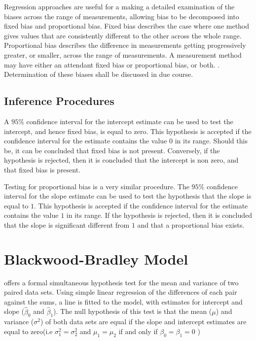\documentclass[12pt, a4paper]{report}
\theoremstyle{plain}
\theoremstyle{definition}
\theoremstyle{remark}
\begin{document}
	Regression approaches are useful for a making a detailed examination of the biases across the range of measurements, allowing bias to be decomposed into fixed bias and proportional bias.
	Fixed bias describes the case where one method gives values that are consistently different
	to the other across the whole range. Proportional
	bias describes the difference in measurements getting progressively greater, or smaller, across the range of measurements. A measurement method may have either an attendant fixed bias or proportional bias, or both. \citep{ludbrook}. Determination of these biases shall be discussed in due course.
	
	
	



\subsection{Inference Procedures}
A $95\%$ confidence interval for the intercept estimate can be used to test the intercept, and hence fixed bias, is equal to
zero. This hypothesis is accepted if the confidence interval for the estimate contains the value $0$ in its range. Should this be,
it can be concluded that fixed bias is not present. Conversely, if the hypothesis is rejected, then it is concluded that the
intercept is non zero, and that fixed bias is present.

Testing for proportional bias is a very similar procedure. The $95\%$ confidence interval for the slope estimate can be used to
test the hypothesis that the slope is equal to $1$. This hypothesis is accepted if the confidence interval for the estimate
contains the value $1$ in its range. If the hypothesis is rejected, then it is concluded that the slope is significant
different from $1$ and that a proportional bias exists.



	\section{Blackwood-Bradley Model} 
\citet{BB89} offers a formal simultaneous hypothesis test for the
mean and variance of two paired data sets. Using simple linear
regression of the differences of each pair against the sums, a
line is fitted to the model, with estimates for intercept and
slope ($\hat{\beta}_{0}$ and $\hat{\beta}_{1}$). The null
hypothesis of this test is that the mean ($\mu$) and variance
($\sigma^{2}$) of both data sets are equal if the slope and
intercept estimates are equal to zero(i.e $\sigma^{2}_{1} =
\sigma^{2}_{2}$ and $\mu_{1}=\mu_{2}$ if and only if $\beta_{0}=
\beta_{1}=0$ )	
\end{document}
